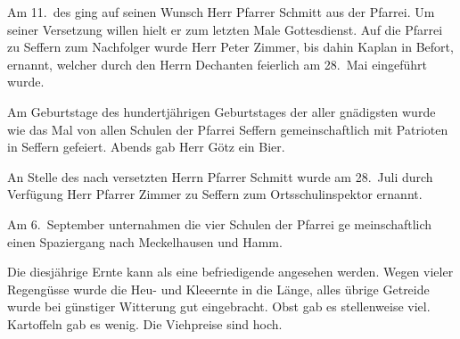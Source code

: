 

\pstart
Am 11.\ des\unsicher{} ging auf seinen Wunsch Herr Pfarrer Schmitt aus\ob
der Pfarrei. Um seiner Versetzung willen hielt er zum\ob
letzten Male Gottesdienst. Auf die Pfarrei zu Seffern zum\ob
Nachfolger wurde Herr Peter Zimmer, bis dahin Kaplan in\ob
Befort\unsicher, ernannt, welcher durch den Herrn Dechanten\ob
feierlich am 28.\ Mai\unsicher{} eingeführt wurde.

\pend
{}
\pstart

Am Geburtstage des\unsicher{} hundertjährigen\unsicher{} Geburtstages der aller\ohb
gnädigsten\unsicher{} wurde wie das Mal von allen Schulen der Pfarrei\ob
Seffern gemeinschaftlich mit Patrioten\unsicher{} in Seffern\unsicher\ob
gefeiert. Abends gab Herr Götz ein Bier\unsicher.

\pend
{}
\pstart

An Stelle des nach\unsicher{} versetzten Herrn Pfarrer\ob
Schmitt wurde am 28.\ Juli durch Verfügung Herr Pfarrer\ob
Zimmer zu Seffern zum Ortsschulinspektor ernannt.

\pend
{}
\pstart

Am 6.\ September unternahmen die vier Schulen der Pfarrei ge\ohb
meinschaftlich einen Spaziergang nach Meckelhausen und\ob
Hamm.

\pend
{}
\pstart

%
 Die diesjährige Ernte kann als eine befriedigende angesehen\ob
werden. Wegen vieler Regengüsse\unsicher{} wurde die Heu- und\ob
Kleeernte in die Länge, alles übrige Getreide\ob
wurde bei günstiger Witterung gut eingebracht. Obst gab es\ob
{}%
stellenweise viel\unsicher. Kartoffeln gab es wenig\unsicher. Die Viehpreise\ob
sind hoch.
\pend
